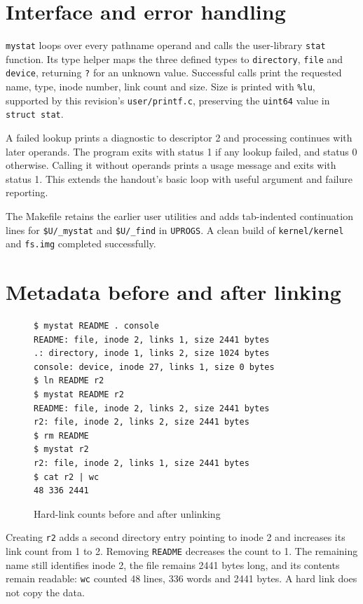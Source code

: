 \documentclass{../latex/utmreport}
\begin{document}
\section{Interface and error
handling}\label{interface-and-error-handling}

\texttt{mystat} loops over every pathname operand and calls the
user-library \texttt{stat} function. Its type helper maps the three
defined types to \texttt{directory}, \texttt{file} and \texttt{device},
returning \texttt{?} for an unknown value. Successful calls print the
requested name, type, inode number, link count and size. Size is printed
with \texttt{\%lu}, supported by this revision's \texttt{user/printf.c},
preserving the \texttt{uint64} value in \texttt{struct\ stat}.

A failed lookup prints a diagnostic to descriptor 2 and processing
continues with later operands. The program exits with status 1 if any
lookup failed, and status 0 otherwise. Calling it without operands
prints a usage message and exits with status 1. This extends the
handout's basic loop with useful argument and failure reporting.

The Makefile retains the earlier user utilities and adds tab-indented
continuation lines for \texttt{\$U/\_mystat} and \texttt{\$U/\_find} in
\texttt{UPROGS}. A clean build of \texttt{kernel/kernel} and
\texttt{fs.img} completed successfully.

\section{Metadata before and after
linking}\label{metadata-before-and-after-linking}

\begin{figure}[H]
\begin{lstlisting}
$ mystat README . console
README: file, inode 2, links 1, size 2441 bytes
.: directory, inode 1, links 2, size 1024 bytes
console: device, inode 27, links 1, size 0 bytes
$ ln README r2
$ mystat README r2
README: file, inode 2, links 2, size 2441 bytes
r2: file, inode 2, links 2, size 2441 bytes
$ rm README
$ mystat r2
r2: file, inode 2, links 1, size 2441 bytes
$ cat r2 | wc
48 336 2441
\end{lstlisting}
\caption{Hard-link counts before and after unlinking}
\end{figure}

Creating \texttt{r2} adds a second directory entry pointing to inode 2
and increases its link count from 1 to 2. Removing \texttt{README}
decreases the count to 1. The remaining name still identifies inode 2,
the file remains 2441 bytes long, and its contents remain readable:
\texttt{wc} counted 48 lines, 336 words and 2441 bytes. A hard link does
not copy the data.
\end{document}
